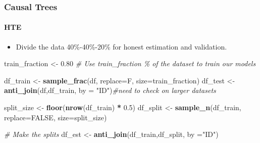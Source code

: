 \documentclass[
  shownotes,
  xcolor={svgnames},
  hyperref={colorlinks,citecolor=DarkBlue,linkcolor=DarkRed,urlcolor=DarkBlue}
  , aspectratio=169]{beamer}
\newenvironment{Shaded}{\begin{snugshade}}{\end{snugshade}}
\newcommand{\CommentTok}[1]{\textcolor[rgb]{0.56,0.35,0.01}{\textit{#1}}}
\newcommand{\DataTypeTok}[1]{\textcolor[rgb]{0.13,0.29,0.53}{#1}}
\newcommand{\FloatTok}[1]{\textcolor[rgb]{0.00,0.00,0.81}{#1}}
\newcommand{\KeywordTok}[1]{\textcolor[rgb]{0.13,0.29,0.53}{\textbf{#1}}}
\newcommand{\NormalTok}[1]{#1}
\newcommand{\OperatorTok}[1]{\textcolor[rgb]{0.81,0.36,0.00}{\textbf{#1}}}
\newcommand{\OtherTok}[1]{\textcolor[rgb]{0.56,0.35,0.01}{#1}}
\newcommand{\StringTok}[1]{\textcolor[rgb]{0.31,0.60,0.02}{#1}}
\begin{document}
\begin{frame}[fragile]
\frametitle{Causal Trees}
\framesubtitle{HTE}

\begin{itemize}
\item Divide the data 40\%-40\%-20\% for honest estimation and validation.
\end{itemize}

\begin{scriptsize}


\begin{Shaded}
\begin{Highlighting}[]
\NormalTok{train\_fraction \textless{}{-}}\StringTok{ }\FloatTok{0.80}  \CommentTok{\# Use train\_fraction \% of the dataset to train our models}

\NormalTok{df\_train \textless{}{-}}\StringTok{ }\KeywordTok{sample\_frac}\NormalTok{(df, }\DataTypeTok{replace=}\NormalTok{F, }\DataTypeTok{size=}\NormalTok{train\_fraction)}
\NormalTok{df\_test \textless{}{-}}\StringTok{ }\KeywordTok{anti\_join}\NormalTok{(df,df\_train, }\DataTypeTok{by =} \StringTok{"ID"}\NormalTok{)}\CommentTok{\#need to check on larger datasets}


\NormalTok{split\_size \textless{}{-}}\StringTok{ }\KeywordTok{floor}\NormalTok{(}\KeywordTok{nrow}\NormalTok{(df\_train) }\OperatorTok{*}\StringTok{ }\FloatTok{0.5}\NormalTok{)}
\NormalTok{df\_split \textless{}{-}}\StringTok{ }\KeywordTok{sample\_n}\NormalTok{(df\_train, }\DataTypeTok{replace=}\OtherTok{FALSE}\NormalTok{, }\DataTypeTok{size=}\NormalTok{split\_size)}

\CommentTok{\# Make the splits}
\NormalTok{df\_est \textless{}{-}}\StringTok{ }\KeywordTok{anti\_join}\NormalTok{(df\_train,df\_split, }\DataTypeTok{by =}\StringTok{"ID"}\NormalTok{)}
\end{Highlighting}
\end{Shaded}
\end{scriptsize}

\end{frame}
\end{document}
